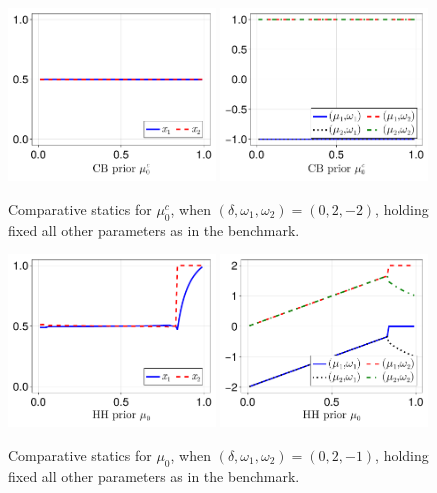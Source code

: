\documentclass[12pt,a4paper]{article}
\begin{document}
\begin{figure}[H]
\centering
\includegraphics[width=0.49\textwidth]{figures/V8/γ_1/fig_optimal_π_across_μ_0_c_ω_1_2_ω_2_-2_δ_0.0_.pdf}
\includegraphics[width=0.49\textwidth]{figures/V8/γ_1/fig_posterior_across_μ_0_c_ω_1_2_ω_2_-2_δ_0.0_.pdf}
\caption{Comparative statics for $\mu_0^c$, when $(\delta,\omega_1,\omega_2)=(0,2,-2)$, holding fixed all other parameters as in the benchmark.}
\label{FigureA26}
\end{figure}

\begin{figure}[H]
\centering
\includegraphics[width=0.49\textwidth]{figures/V8/γ_1/fig_optimal_π_across_μ_0_ω_1_2_ω_2_-1_δ_0.0_.pdf}
\includegraphics[width=0.49\textwidth]{figures/V8/γ_1/fig_posterior_across_μ_0_ω_1_2_ω_2_-1_δ_0.0_.pdf}
\caption{Comparative statics for $\mu_0$, when $(\delta,\omega_1,\omega_2)=(0,2,-1)$, holding fixed all other parameters as in the benchmark.}
\label{FigureA27}
\end{figure}
\end{document}
